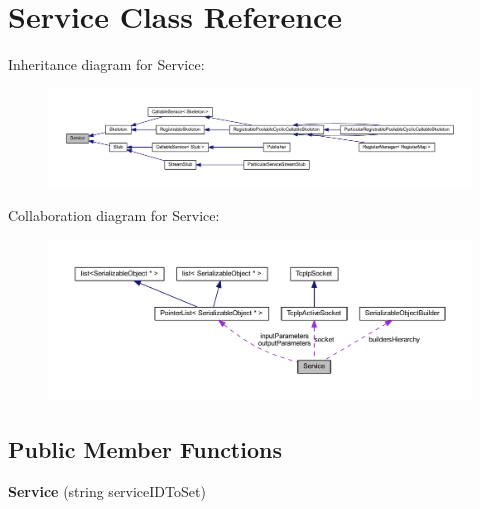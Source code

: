 \hypertarget{class_service}{
\section{Service Class Reference}
\label{class_service}
}


Inheritance diagram for Service:\nopagebreak
\begin{figure}[H]
\begin{center}
\leavevmode
\includegraphics[width=400pt]{class_service__inherit__graph}
\end{center}
\end{figure}


Collaboration diagram for Service:\nopagebreak
\begin{figure}[H]
\begin{center}
\leavevmode
\includegraphics[width=400pt]{class_service__coll__graph}
\end{center}
\end{figure}
\subsection*{Public Member Functions}
\begin{DoxyCompactItemize}
\item 
\hypertarget{class_service_a3ef326da7f282d250f2a6a59ac75d437}{
{\bfseries Service} (string serviceIDToSet)}
\label{class_service_a3ef326da7f282d250f2a6a59ac75d437}

\end{DoxyCompactItemize}
